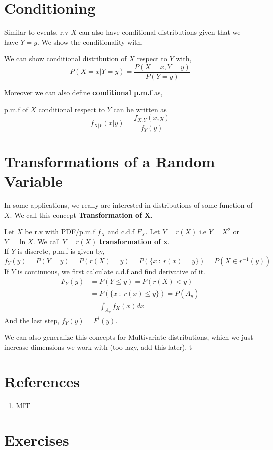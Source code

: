 \section{Conditioning}
Similar to events, r.v $X$ can also have conditional distributions given that we have $Y=y$. We show the conditionality with,
\begin{definition}
    We can show conditional distribution of $X$ respect to $Y$ with,
    \[P(X=x| Y=y) = \frac{ P(X=x,Y=y)}{P(Y=y)} \]
\end{definition}
Moreover we can also define \textbf{conditional p.m.f} as,
\begin{definition}
    p.m.f of $X$ conditional respect to $Y$ can be written as
    \[ f_{X|Y}(x|y)= \frac{f_{X,Y}(x,y)}{f_Y(y)}\]
\end{definition}


\section{Transformations of a Random Variable}
In some applications, we really are interested in distributions of some function of $X$. We call this concept \textbf{Transformation of X}.
\begin{definition}
    Let $X$ be r.v with PDF/p.m.f $f_X$ and c.d.f $F_X$. Let $Y=r(X)$ i.e $Y=X^2$ or $Y = \ln X$. We call $Y=r(X)$ \textbf{transformation of x}. \\
    \newline
    If $Y$ is discrete, p.m.f is given by,
    \[f_Y(y)= P(Y=y) =  P( r(X) = y) = P( \{x \ : \ r(x) = y\})= P( X \in r^{-1}(y)) \]
    \newline
    If $Y$ is continuous, we first calculate c.d.f and find derivative of it.
    \begin{align*}
        F_Y(y) &= P( Y \le y) = P(r(X) < y) \\
        &= P(\{x \ : \ r(x) \le y \}) = P( A_y)    \\
        &= \int_{A_y} f_X(x)dx
    \end{align*}
    And the last step, $f_Y(y) = F^{'}(y)$.
\end{definition}
We can also generalize this concepts for Multivariate distributions, which we just increase dimensions we work with (too lazy, add this later).
t
\section{References}
\begin{enumerate}
    \item MIT
\end{enumerate}
\section{Exercises}
